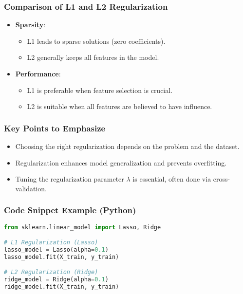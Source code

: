 \documentclass[aspectratio=169]{beamer}
\begin{document}
\begin{frame}[fragile]
    \frametitle{Comparison of L1 and L2 Regularization}
    \begin{itemize}
        \item \textbf{Sparsity}: 
        \begin{itemize}
            \item L1 leads to sparse solutions (zero coefficients).
            \item L2 generally keeps all features in the model.
        \end{itemize}
        \item \textbf{Performance}:
        \begin{itemize}
            \item L1 is preferable when feature selection is crucial.
            \item L2 is suitable when all features are believed to have influence.
        \end{itemize}
    \end{itemize}
\end{frame}

\begin{frame}[fragile]
    \frametitle{Key Points to Emphasize}
    \begin{itemize}
        \item Choosing the right regularization depends on the problem and the dataset.
        \item Regularization enhances model generalization and prevents overfitting.
        \item Tuning the regularization parameter $\lambda$ is essential, often done via cross-validation.
    \end{itemize}
\end{frame}

\begin{frame}[fragile]
    \frametitle{Code Snippet Example (Python)}
    \begin{lstlisting}[language=Python]
from sklearn.linear_model import Lasso, Ridge

# L1 Regularization (Lasso)
lasso_model = Lasso(alpha=0.1)
lasso_model.fit(X_train, y_train)

# L2 Regularization (Ridge)
ridge_model = Ridge(alpha=0.1)
ridge_model.fit(X_train, y_train)
    \end{lstlisting}
\end{frame}
\end{document}
